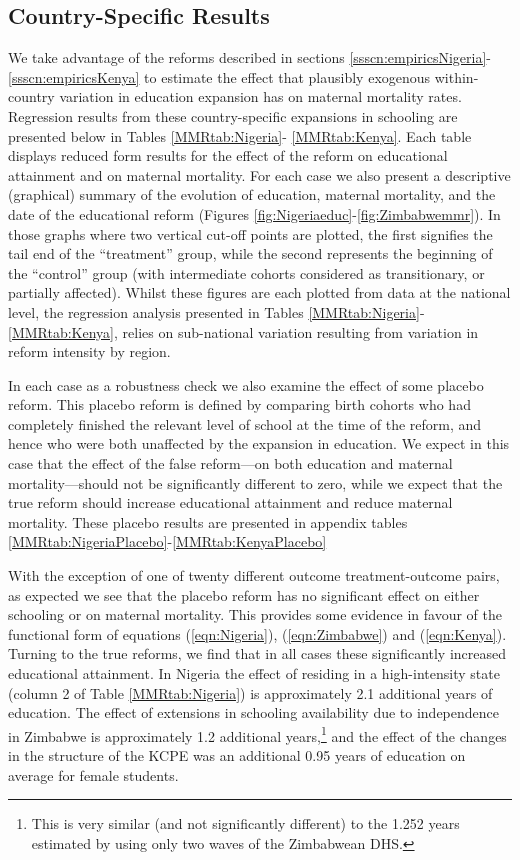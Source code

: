 \documentclass{article}[12pt,subeqn]
\begin{document}
\begin{spacing}{1.4}
\subsection{Country-Specific Results}
\label{sscn:casestudies}
We take advantage of the reforms described in sections 
\ref{ssscn:empiricsNigeria}-\ref{ssscn:empiricsKenya} to estimate the effect that 
plausibly exogenous within-country variation in education expansion has on 
maternal mortality rates. Regression results from these country-specific 
expansions in schooling are presented below in Tables \ref{MMRtab:Nigeria}-%
\ref{MMRtab:Kenya}. Each table displays reduced form results for the effect of 
the reform on educational attainment and on maternal mortality. For each case we 
also present a descriptive (graphical) summary of the evolution of education, 
maternal mortality, and the date of the educational reform (Figures 
\ref{fig:Nigeriaeduc}-\ref{fig:Zimbabwemmr}). In those graphs where two vertical 
cut-off points are plotted, the first signifies the tail end of the ``treatment'' 
group, while the second represents the beginning of the ``control'' group (with 
intermediate cohorts considered as transitionary, or partially affected). Whilst 
these figures are each plotted from data at the national level, the regression 
analysis presented in Tables \ref{MMRtab:Nigeria}-\ref{MMRtab:Kenya}, relies on 
sub-national variation resulting from variation in reform intensity by region. 

In each case as a robustness check we also examine the effect of some placebo 
reform. This placebo reform is defined by comparing birth cohorts who had 
completely finished the relevant level of school at the time of the reform, and 
hence who were both unaffected by the expansion in education.  We expect in this 
case that the effect of the false reform---on both education and maternal 
mortality---should not be significantly different to zero, while we expect that 
the true reform should increase educational attainment and reduce maternal 
mortality.  These placebo results are presented in appendix tables 
\ref{MMRtab:NigeriaPlacebo}-\ref{MMRtab:KenyaPlacebo}

With the exception of one of twenty different outcome treatment-outcome pairs, as 
expected we see that the placebo reform has no significant effect on either 
schooling or on maternal mortality.  This provides some evidence in favour of the 
functional form of equations (\ref{eqn:Nigeria}), (\ref{eqn:Zimbabwe}) and 
(\ref{eqn:Kenya}). Turning to the true reforms, we find that in all cases these 
significantly increased educational attainment. In Nigeria the effect of residing 
in a high-intensity state (column 2 of Table \ref{MMRtab:Nigeria}) is approximately 
2.1 additional years of education.  The effect of extensions in schooling 
availability due to independence in Zimbabwe is approximately 1.2 additional 
years,\footnote{This is very similar (and not significantly different) to the 
1.252 years estimated by \citet{AgueroBharawadj2011} using only two waves of the 
Zimbabwean DHS.} and the effect of the changes in the structure of the KCPE was an 
additional 0.95 years of education on average for female students.


\end{spacing}
\end{document}
